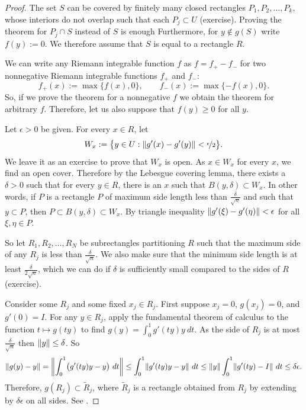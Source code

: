 \begin{proof}

The set $S$ can be covered by finitely many closed rectangles
$P_1,P_2,\ldots,P_k$, whose
interiors do not overlap such that each $P_j \subset U$
(exercise).
Proving the theorem for $P_j \cap S$ instead of $S$ is enough
Furthermore, for $y \notin g(S)$ write $f(y) := 0$.
We therefore assume that $S$ is equal to a rectangle $R$.

We can write any Riemann integrable function $f$ as
$f = f_+ - f_-$ for two nonnegative Riemann integrable
functions $f_+$ and $f_-$:
\begin{equation*}
f_+(x) := \max \{ f(x) , 0 \}, \qquad
f_-(x) := \max \{ -f(x) , 0 \} .
\end{equation*}
So, if we prove the theorem for a nonnegative $f$
we obtain the theorem for arbitrary $f$.
Therefore, let us also suppose that 
$f(y) \geq 0$ for all $y$.

Let $\epsilon > 0$ be given.
For every $x \in R$, let
\begin{equation*}
W_x := \bigl\{ y \in U : \lVert {g'(x)-g'(y)} \rVert < \nicefrac{\epsilon}{2} \bigr\} .
\end{equation*}
We leave it as an exercise to prove that $W_x$ is open.
As $x \in W_x$ for every $x$, we find an open cover.  Therefore
by the Lebesgue covering lemma, there exists a $\delta > 0$ such that
for every $y \in R$, there is an $x$ such that $B(y,\delta) \subset W_x$.
In other words, if $P$ is a rectangle $P$ of maximum side length less
than $\frac{\delta}{\sqrt{n}}$ and such that $y \subset P$, then $P \subset
B(y,\delta) \subset W_x$.  By triangle inequality
$\lVert {g'(\xi)-g'(\eta)} \rVert < \epsilon$ for all $\xi, \eta \in P$.

So let $R_1,R_2,\ldots,R_N$ be subrectangles partitioning $R$ such that
the maximum side of any $R_j$ is less than
$\frac{\delta}{\sqrt{n}}$.
We also make sure that the minimum side length is at least
$\frac{\delta}{2\sqrt{n}}$, which we can do if $\delta$ is 
sufficiently small compared to the sides of $R$ (exercise).

Consider some $R_j$ and some fixed $x_j \in R_j$.
First suppose $x_j=0$, $g(x_j) = 0$, and $g'(0) = I$.
For any $y \in R_j$,
apply the fundamental theorem of calculus
to the function $t \mapsto g(ty)$ to find
$g(y) = \int_0^1 g'(ty)y ~dt$.  As the
side of $R_j$ is at most $\frac{\delta}{\sqrt{n}}$
then $\lVert {y} \rVert \leq \delta$.  So
\begin{equation*}
\lVert {g(y)-y} \rVert =
\left\lVert {\int_0^1 \bigl(g'(ty) y - y\bigr) ~dt} \right\rVert \leq
\int_0^1 \lVert {g'(ty) y - y} \rVert ~dt \leq
\lVert {y} \rVert \int_0^1 \lVert {g'(ty) - I} \rVert ~dt
\leq
\delta \epsilon .
\end{equation*}
Therefore, $g(R_j) \subset \widetilde{R}_j$, where
$\widetilde{R}_j$ is a rectangle obtained from
$R_j$ by extending by
$\delta \epsilon$ on all sides.  See .


\end{proof}
